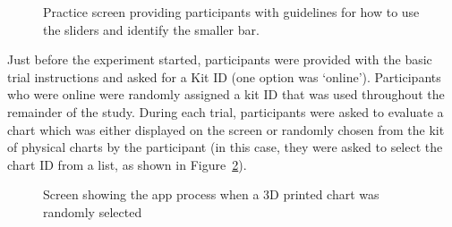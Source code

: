 \documentclass[runningheads
]{llncs}
\begin{document}
\begin{figure}


\caption{\label{fig-practice-screen}Practice screen providing
participants with guidelines for how to use the sliders and identify the
smaller bar.}

\end{figure}%

Just before the experiment started, participants were provided with the
basic trial instructions and asked for a Kit ID (one option was
`online'). Participants who were online were randomly assigned a kit ID
that was used throughout the remainder of the study. During each trial,
participants were asked to evaluate a chart which was either displayed
on the screen or randomly chosen from the kit of physical charts by the
participant (in this case, they were asked to select the chart ID from a
list, as shown in Figure~\ref{fig-chart-id}).

\begin{figure}


\caption{\label{fig-chart-id}Screen showing the app process when a 3D
printed chart was randomly selected}

\end{figure}%
\end{document}
